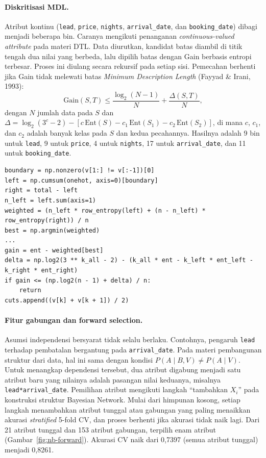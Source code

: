 \paragraph{Diskritisasi MDL.}
Atribut kontinu (\texttt{lead}, \texttt{price}, \texttt{nights},
\texttt{arrival\_date}, dan \texttt{booking\_date}) dibagi menjadi beberapa bin.
Caranya mengikuti penanganan \textit{continuous-valued attribute} pada materi DTL.
Data diurutkan, kandidat batas diambil di titik tengah dua nilai yang berbeda, lalu
dipilih batas dengan Gain berbasis entropi terbesar. Proses ini diulang secara
rekursif pada setiap sisi. Pemecahan berhenti jika Gain tidak melewati batas
\textit{Minimum Description Length} (Fayyad \& Irani, 1993):
\[
  \mathrm{Gain}(S, T) \le \frac{\log_2(N-1)}{N} + \frac{\Delta(S, T)}{N},
\]
dengan $N$ jumlah data pada $S$ dan
$\Delta = \log_2(3^{c}-2) - [c\,\mathrm{Ent}(S) - c_1\,\mathrm{Ent}(S_1) - c_2\,\mathrm{Ent}(S_2)]$,
di mana $c$, $c_1$, dan $c_2$ adalah banyak kelas pada $S$ dan kedua
pecahannya. Hasilnya adalah 9 bin untuk \texttt{lead}, 9 untuk \texttt{price},
4 untuk \texttt{nights}, 17 untuk \texttt{arrival\_date}, dan 11 untuk
\texttt{booking\_date}.
\begin{lstlisting}
boundary = np.nonzero(v[1:] != v[:-1])[0]
left = np.cumsum(onehot, axis=0)[boundary]
right = total - left
n_left = left.sum(axis=1)
weighted = (n_left * row_entropy(left) + (n - n_left) * row_entropy(right)) / n
best = np.argmin(weighted)
...
gain = ent - weighted[best]
delta = np.log2(3 ** k_all - 2) - (k_all * ent - k_left * ent_left - k_right * ent_right)
if gain <= (np.log2(n - 1) + delta) / n:
    return
cuts.append((v[k] + v[k + 1]) / 2)
\end{lstlisting}

\paragraph{Fitur gabungan dan forward selection.}
Asumsi independensi bersyarat tidak selalu berlaku. Contohnya, pengaruh
\texttt{lead} terhadap pembatalan bergantung pada \texttt{arrival\_date}. Pada
materi pembangunan struktur dari data, hal ini sama dengan kondisi
$P(A \mid B, V) \neq P(A \mid V)$. Untuk menangkap dependensi tersebut, dua atribut
digabung menjadi satu atribut baru yang nilainya adalah pasangan nilai keduanya,
misalnya \texttt{lead*arrival\_date}. Pemilihan atribut mengikuti langkah
``tambahkan $X_i$'' pada konstruksi struktur Bayesian Network. Mulai dari himpunan
kosong, setiap langkah menambahkan atribut tunggal atau gabungan yang paling
menaikkan akurasi \textit{stratified} 5-fold CV, dan proses berhenti jika akurasi
tidak naik lagi. Dari 21 atribut tunggal dan 153 atribut gabungan, terpilih enam
atribut (Gambar~\ref{fig:nb-forward}). Akurasi CV naik dari 0,7397 (semua atribut
tunggal) menjadi 0,8261.

